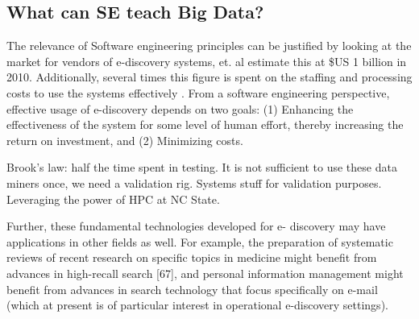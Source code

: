 \documentclass{sig-alternate-05-2015}
\begin{document}
\subsection{What can SE teach Big Data?}
The relevance of Software engineering principles can be justified by looking at the market for vendors of e-discovery systems, et. al \cite{} estimate this at \$US 1 billion in 2010. Additionally, several times this figure is spent on the staffing and processing costs to use the systems effectively \cite{}. From a software engineering perspective, effective usage of e-discovery depends on two goals: (1) Enhancing the effectiveness of the system for some level of human effort, thereby increasing the return on investment, and (2) Minimizing costs. 

Brook's law: half the time spent in testing. It is not sufficient to use these data miners once, we need a validation rig. Systems stuff for validation purposes. Leveraging the power of HPC at NC State.

Further, these fundamental technologies developed for e- discovery may have applications in other fields as well. For example, the preparation of systematic reviews of recent research on specific topics in medicine might benefit from advances in high-recall search [67], and personal information management might benefit from advances in search technology that focus specifically on e-mail (which at present is of particular interest in operational e-discovery settings).
\end{document}
